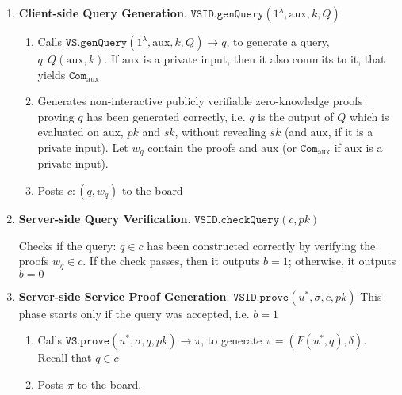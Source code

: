 \begin{enumerate}
\item\textbf{Client-side Query Generation}\label{VSID::Client-side-QueryGeneration}. $\mathtt{VSID.genQuery}(1^{\lambda},  \text{aux},k,Q)$ 
\begin{enumerate}
\item Calls $\mathtt{VS.genQuery}(1^{\lambda}, \text{aux},k,Q)\rightarrow q$, to generate a query, $q:Q(\text{aux},k)$. If $\text{aux}$ is a private input, then it also commits to it,  that yields  $\mathtt{Com}_{\scriptscriptstyle \text{aux}}$
\item Generates non-interactive publicly verifiable zero-knowledge proofs proving $q$ has been generated correctly, i.e. $q$ is the
output of $Q$ which is evaluated on $\text{aux}$, $pk$ and $sk$, without revealing $sk$ (and $\text{aux}$, if it is a private input). Let $w_{\scriptscriptstyle q}$ contain the proofs and  $\text{aux}$ (or  $\mathtt{Com}_{\scriptscriptstyle \text{aux}}$ if $\text{aux}$ is a private input).
\item Posts $c:(q,w_{\scriptscriptstyle q})$ to the board 
\end{enumerate}

\item\textbf{Server-side Query Verification}. $\mathtt{VSID.checkQuery}(c, pk)$

Checks if   the query: $q\in c$ has been constructed correctly by verifying the proofs  $w_{\scriptscriptstyle q}\in c$. If the check passes, then it outputs $b=1$; otherwise, it outputs $b=0$



\item\textbf{Server-side Service Proof Generation}. $\mathtt{VSID.prove}(u^{\scriptscriptstyle *},\sigma,c,pk)$ This phase starts only if the query was accepted, i.e. $b=1$ 
\begin{enumerate}
\item Calls $\mathtt{VS.prove}(u^{\scriptscriptstyle *},\sigma,q,pk)\rightarrow \pi$, to generate $\pi=(F(u^{\scriptscriptstyle *},q),\delta)$. Recall that $q\in c$
\item Posts $\pi$ to the board. 
\end{enumerate}


\end{enumerate}
